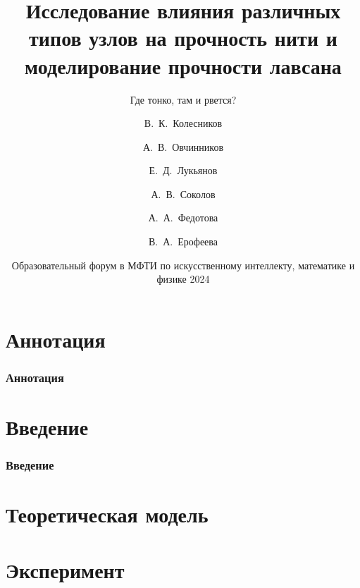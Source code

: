 \documentclass{beamer}
\title[] %
{Исследование влияния различных типов узлов на прочность нити и моделирование прочности лавсана}
\subtitle{Где тонко, там и рвется?}
\author[] %
{В.~К.~Колесников\inst{1} \and А.~В.~Овчинников\inst{2} \and Е.~Д.~Лукьянов \inst{3} \and А.~В.~Соколов \inst{4} \and А.~А.~Федотова \inst{5} \and В.~А.~Ерофеева \inst{6}}
\institute[Образовательный форум в МФТИ] %
{
  \inst{1}%
  МАИ
  \and
  \inst{2}%
  МФТИ
  \and
  \inst{3}%
  МГТУ им Г. И. Носова
  \and
  \inst{4}%
  ЮФУ
  \and
  \inst{5}%
  МГТУ им н.э. Баумана
  \and
  \inst{6}%
  ИГУ
}
\date[] %
{Образовательный форум в МФТИ по искусственному интеллекту, математике и физике 2024}
\begin{document}
\begin{frame}
\maketitle
\end{frame}

\section{Аннотация}

\begin{frame}
\frametitle{Аннотация}

\end{frame}


\section{Введение}

\begin{frame}
\frametitle{Введение}

\end{frame}


\section{Теоретическая модель}

\begin{frame}
\frametitle{}
    
\end{frame}

\section{Эксперимент}

\begin{frame}
\frametitle{}
    
\end{frame}

\section{}
\end{document}
